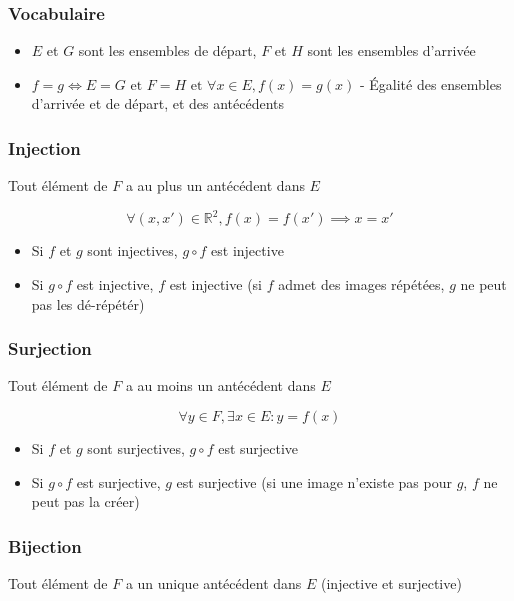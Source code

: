 \documentclass[openany]{book}
\begin{document}
\subsubsection{Vocabulaire}

\begin{itemize}
    \item $E$ et $G$ sont les ensembles de départ, $F$ et $H$ sont les ensembles d'arrivée
    \item $f = g \iff E=G \text{ et } F=H \text{ et } \forall x \in E, f(x)=g(x) $ - Égalité des ensembles d'arrivée et de départ, et des antécédents
\end{itemize}

\subsubsection{Injection}
Tout élément de $F$ a au plus un antécédent dans $E$

\[ \forall(x, x')\in \mathbb{R}^2, f(x)=f(x') \implies x=x' \]

\begin{itemize}
    \item Si $f$ et $g$ sont injectives, $g \circ f $ est injective
    \item Si $g \circ f$ est injective, $f$ est injective (si $f$ admet des images répétées, $g$ ne peut pas les dé-répétér)
\end{itemize}

\subsubsection{Surjection}
Tout élément de $F$ a au moins un antécédent dans $E$

\[ \forall y \in F, \exists x \in E : y=f(x) \]

\begin{itemize}
    \item Si $f$ et $g$ sont surjectives, $g \circ f $ est surjective
    \item Si $g \circ f$ est surjective, $g$ est surjective (si une image n'existe pas pour $g$, $f$ ne peut pas la créer)
\end{itemize}

\subsubsection{Bijection}
Tout élément de $F$ a un unique antécédent dans $E$ (injective et surjective)
\end{document}
